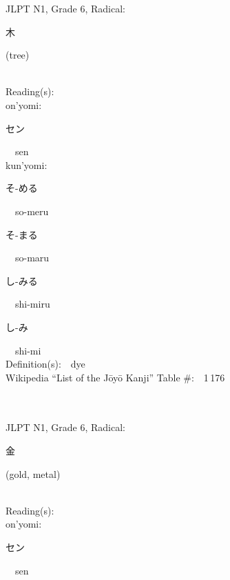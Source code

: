 \begin{multicols}{2}
{JLPT N1, Grade 6, Radical:\ \ {\begin{CJK}{UTF8}{min} 木 \end{CJK}} (tree) } \\
Reading(s):\ \ \\
{\hspace*{1em}}on'yomi:\ \ \\
{\hspace*{2em}}{\begin{CJK}{UTF8}{min} セン \end{CJK}}\ \ sen\ \ \\
{\hspace*{1em}}kun'yomi:\ \ \\
{\hspace*{2em}}{\begin{CJK}{UTF8}{min} そ-める \end{CJK}}\ \ so-meru\ \ \\
{\hspace*{2em}}{\begin{CJK}{UTF8}{min} そ-まる \end{CJK}}\ \ so-maru\ \ \\
{\hspace*{2em}}{\begin{CJK}{UTF8}{min} し-みる \end{CJK}}\ \ shi-miru\ \ \\
{\hspace*{2em}}{\begin{CJK}{UTF8}{min} し-み \end{CJK}}\ \ shi-mi\ \ \\
Definition(s):\ \ dye \\
Wikipedia ``List of the J\=oy\=o Kanji'' Table \#:\ \ 1\,176 \\
\ \ \\
{\fontsize{34pt}{40pt}  }\ \ \\  %
{JLPT N1, Grade 6, Radical:\ \ {\begin{CJK}{UTF8}{min} 金 \end{CJK}} (gold, metal) } \\
Reading(s):\ \ \\
{\hspace*{1em}}on'yomi:\ \ \\
{\hspace*{2em}}{\begin{CJK}{UTF8}{min} セン \end{CJK}}\ \ sen\ \ \\

\end{multicols}
